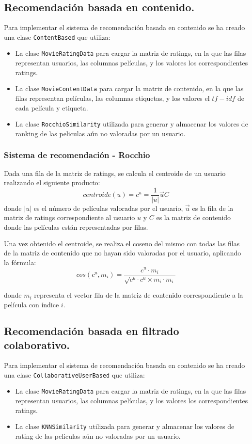 \documentclass[spanish]{assignment}
\begin{document}
	\newpage
	\subsection{Recomendación basada en contenido.}
	Para implementar el sistema de recomendación basada en contenido se ha creado una clase \texttt{ContentBased} que utiliza:
	\begin{itemize}
		\item La clase \texttt{MovieRatingData} para cargar la matriz de ratings, en la que las filas representan usuarios, las columnas películas, y los valores los correspondientes ratings.
		\item La clase \texttt{MovieContentData} para cargar la matriz de contenido, en la que las filas representan películas, las columnas etiquetas, y los valores el $tf-idf$ de cada película y etiqueta. 
		\item La clase \texttt{RocchioSimilarity} utilizada para generar y almacenar los valores de ranking de las peliculas aún no valoradas por un usuario.
	\end{itemize}
	
	\subsubsection{Sistema de recomendación - Rocchio}
	Dada una fila de la matriz de ratings, se calcula el centroide de un usuario realizando el siguiente producto:
	$$centroide(u) = c^u = \frac{1}{|u|}\vec{u}C$$
	donde $|u|$ es el número de películas valoradas por el usuario, $\vec{u}$ es la fila de la matriz de ratings correspondiente al usuario $u$ y $C$ es la matriz de contenido donde las películas están representadas por filas.
	
	Una vez obtenido el centroide, se realiza el coseno del mismo con todas las filas de la matriz de contenido que no hayan sido valoradas por el usuario, aplicando la fórmula:
	$$cos(c^u, m_i) = \frac{c^u\cdot m_i}{\sqrt{c^u\cdot c^u\times m_i\cdot m_i}}$$
	
	donde $m_i$ representa el vector fila de la matriz de contenido correspondiente a la película con índice $i$.
	
	\subsection{Recomendación basada en filtrado colaborativo.}
	Para implementar el sistema de recomendación basada en contenido se ha creado una clase \texttt{CollaborativeUserBased} que utiliza:
	\begin{itemize}
		\item La clase \texttt{MovieRatingData} para cargar la matriz de ratings, en la que las filas representan usuarios, las columnas películas, y los valores los correspondientes ratings.
		\item La clase \texttt{KNNSimilarity} utilizada para generar y almacenar los valores de rating de las peliculas aún no valoradas por un usuario.
	\end{itemize}
	
\end{document}
